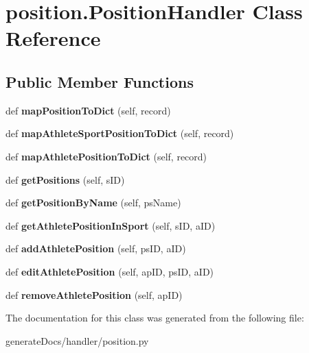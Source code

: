 \hypertarget{classposition_1_1_position_handler}{}\section{position.\+Position\+Handler Class Reference}
\label{classposition_1_1_position_handler}
\subsection*{Public Member Functions}
\begin{DoxyCompactItemize}
\item 
\mbox{\label{classposition_1_1_position_handler_ad7af185c690eb0bc39013b54ee558972}} 
def {\bfseries map\+Position\+To\+Dict} (self, record)
\item 
\mbox{\label{classposition_1_1_position_handler_a3da9fc6dcf65bccfe737fd765c7708fe}} 
def {\bfseries map\+Athlete\+Sport\+Position\+To\+Dict} (self, record)
\item 
\mbox{\label{classposition_1_1_position_handler_aa4bc75d564a4ccbccebf28d63b97ca85}} 
def {\bfseries map\+Athlete\+Position\+To\+Dict} (self, record)
\item 
\mbox{\label{classposition_1_1_position_handler_aeec9163fc8c81f19f73df6b3b994904b}} 
def {\bfseries get\+Positions} (self, s\+ID)
\item 
\mbox{\label{classposition_1_1_position_handler_a2236325a2e1379829acb19d2f04d0c14}} 
def {\bfseries get\+Position\+By\+Name} (self, ps\+Name)
\item 
\mbox{\label{classposition_1_1_position_handler_aea0d7d78a25c452636c0fb7632e668d5}} 
def {\bfseries get\+Athlete\+Position\+In\+Sport} (self, s\+ID, a\+ID)
\item 
\mbox{\label{classposition_1_1_position_handler_a2e0c9bc28ae5479b8e7cd35bc7eb3f22}} 
def {\bfseries add\+Athlete\+Position} (self, ps\+ID, a\+ID)
\item 
\mbox{\label{classposition_1_1_position_handler_a1e5397dbd7a0c9640bf73bb53c05d88a}} 
def {\bfseries edit\+Athlete\+Position} (self, ap\+ID, ps\+ID, a\+ID)
\item 
\mbox{\label{classposition_1_1_position_handler_a9aaf8d8ea82432269b0abb0e7b4a4e7a}} 
def {\bfseries remove\+Athlete\+Position} (self, ap\+ID)
\end{DoxyCompactItemize}


The documentation for this class was generated from the following file\+:\begin{DoxyCompactItemize}
\item 
generate\+Docs/handler/position.\+py\end{DoxyCompactItemize}
